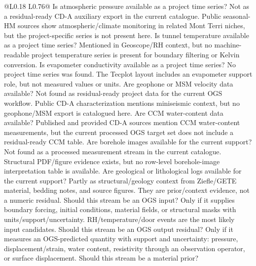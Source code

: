 \begin{longtable}{@{}L{0.18\textwidth} L{0.76\textwidth}@{}}
\toprule
{}
{ Is atmospheric pressure available as a project time series?}
{Not as a residual-ready CD-A auxiliary export in the current catalogue.  Public
seasonal-HM sources show atmospheric/climate monitoring in related Mont Terri niches,
but the project-specific series is not present here.}
{ Is tunnel temperature available as a project time series?}
{Mentioned in Geoscope/RH context, but no machine-readable project temperature series
is present for boundary filtering or Kelvin conversion.}
{ Is evapometer conductivity available as a project time series?}
{No project time series was found.  The Tecplot layout includes an evapometer support
role, but not measured values or units.}
{ Are geophone or MSM velocity data available?}
{Not found as residual-ready project data for the current OGS workflow.  Public CD-A
characterization mentions miniseismic context, but no geophone/MSM export is
catalogued here.}
{ Are CCM water-content data available?}
{Published and provided CD-A sources mention CCM water-content measurements, but the current
processed OGS target set does not include a residual-ready CCM table.}
{ Are borehole images available for the current support?}
{Not found as a processed measurement stream in the current catalogue.  Structural
PDF/figure evidence exists, but no row-level borehole-image interpretation table is
available.}
{ Are geological or lithological logs available for the current support?}
{Partly as structural/geology context from Ziefle/GETE material, bedding notes, and
source figures.  They are prior/context evidence, not a numeric residual.}
{ Should this stream be an OGS input?}
{Only if it supplies boundary forcing, initial conditions, material fields, or
structural masks with units/support/uncertainty.  RH/temperature/door events are the
most likely input candidates.}
{ Should this stream be an OGS output residual?}
{Only if it measures an OGS-predicted quantity with support and uncertainty:
pressure, displacement/strain, water content, resistivity through an observation
operator, or surface displacement.}
{ Should this stream be a material prior?}

\end{longtable}
